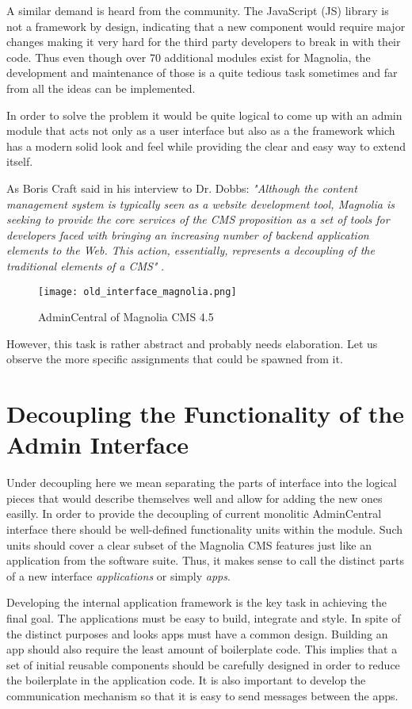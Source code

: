 A similar demand is heard from the community. The JavaScript (JS) library is not
a framework by design, indicating that a new component would require major
changes making it very hard for the third party developers to break in with
their code.
Thus even though over 70 additional modules exist for Magnolia, the development
and maintenance of those is a quite tedious task sometimes and far from all the
ideas can be implemented.

In order to solve the problem it would be quite logical to come up with an admin
module that acts not only as a user interface but also as a the framework which
has a modern solid look and feel while providing the clear and easy way to
extend itself.

As Boris Craft said in his interview to Dr. Dobbs: \emph{"Although the content
management system is typically seen as a website development tool, Magnolia is
seeking to provide the core services of the CMS proposition as a set of tools
for developers faced with bringing an increasing number of backend application
elements to the Web. This action, essentially, represents a decoupling of the
traditional elements of a CMS"} \cite{drdobbs_cms_decouple}.
\begin{figure}[H]
\begin{center}
  \texttt{[image: old\_interface\_magnolia.png]}
  \caption[labelInTOC]{AdminCentral of Magnolia CMS 4.5}
  \label{fig: old_admin_central}
\end{center}
\end{figure}
However, this task is rather abstract and probably needs elaboration. Let us
observe the more specific assignments that could be spawned from it.

\section{Decoupling the Functionality of the Admin Interface}
Under decoupling here we mean separating the parts of interface into the logical
pieces that would describe themselves well and allow for adding the new ones
easilly. In order to provide the decoupling of current monolitic AdminCentral
interface there should be well-defined functionality units within the module.
Such units should cover a clear subset of the Magnolia CMS features just like an
application from the software suite. Thus, it makes sense to call the distinct
parts of a new interface \emph{applications} or simply \emph{apps}.

Developing the internal application framework is the key task in achieving the
final goal. The applications must be easy to build, integrate and style. In
spite of the distinct purposes and looks apps must have a common design.
Building an app should also require the least amount of boilerplate code. This
implies that a set of initial reusable components should be carefully designed
in order to reduce the boilerplate in the application code. It is also important
to develop the communication mechanism so that it is easy to send messages
between the apps.

